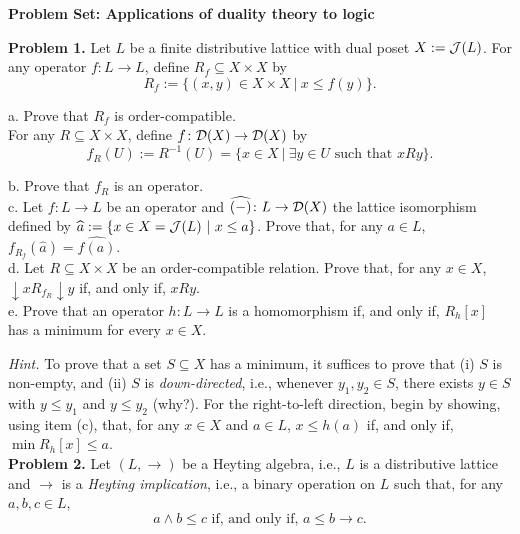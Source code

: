 

\usepackage[final]{pdfpages}
\usepackage{graphicx}



\thispagestyle{empty}
\begin{center}
{\bf Problem Set: Applications of duality theory to logic}
\end{center}

{\bf Problem 1.} Let $L$ be a finite distributive lattice with dual poset $X := \mathcal{J}(L)$. For any operator $f \colon L \to L$, define $R_f \subseteq X \times X$ by
\[ R_f := \{(x,y) \in X \times X \ | \ x \leq f(y)\}.\]

a. Prove that $R_f$ is order-compatible.\\

For any $R \subseteq X \times X$, define $f \colon \mathcal{D}(X) \to \mathcal{D}(X)$ by 
\[ f_R(U) := R^{-1}(U) = \{x \in X \ | \ \exists y \in U \text{ such that } xRy\}.\]

b. Prove that $f_R$ is an operator.\\

c. Let $f \colon L \to L$ be an operator and $\widehat{(-)} \colon L \to \mathcal{D}(X)$ the lattice isomorphism defined by $\widehat{a} := \{x \in X = \mathcal{J}(L) \ | \ x \leq a\}$. Prove that, for any $a \in L$, $f_{R_f}(\widehat{a}) = \widehat{f(a)}$.\\

d. Let $R \subseteq X \times X$ be an order-compatible relation. Prove that, for any $x \in X$, ${\downarrow} x {R_{f_R}} {\downarrow} y$ if, and only if, $xRy$.\\

e. Prove that an operator $h \colon L \to L$ is a homomorphism if, and only if, $R_h[x]$ has a minimum for every $x \in X$.

{\it Hint.} To prove that a set $S \subseteq X$ has a minimum, it suffices to prove that (i) $S$ is non-empty, and (ii) $S$ is \emph{down-directed}, i.e., whenever $y_1, y_2 \in S$, there exists $y \in S$ with $y \leq y_1$ and $y \leq y_2$ (why?). For the right-to-left direction, begin by showing, using item (c), that, for any $x \in X$ and $a \in L$, $x \leq h(a)$ if, and only if, $\min R_h[x] \leq a$. \\

{\bf Problem 2.} Let $(L,\to)$ be a Heyting algebra, i.e., $L$ is a distributive lattice and $\to$ is a \emph{Heyting implication}, i.e., a binary operation on $L$ such that, for any $a, b, c \in L$, 
\[ a \wedge b \leq c \text{ if, and only if, } a \leq b \to c.\]

